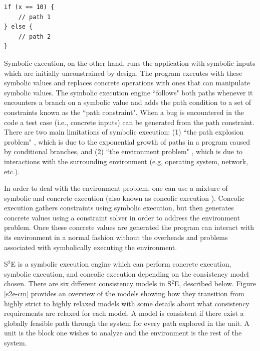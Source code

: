 \documentclass[conference]{IEEEtran}
\begin{document}
\begin{lstlisting}[style=C, label=code-fuzzing, abovecaptionskip=2ex, captionpos=b, caption={Code example where fuzzing generally has poor coverage}]
if (x == 10) {
	// path 1
} else {
	// path 2
}
\end{lstlisting}

 Symbolic execution, on the other hand, runs the application with symbolic inputs \cite{klee} which are initially unconstrained by design. The program executes with these symbolic values and replaces concrete operations with ones that can manipulate symbolic values. The symbolic execution engine ``follows" both paths whenever it encounters a branch on a symbolic value and adds the path condition to a set of constraints known as the ``path constraint". When a bug is encountered in the code a test case (i.e., concrete inputs) can be generated from the path constraint. There are two main limitations of symbolic execution: (1) ``the path explosion problem" \cite{s2e}, which is due to the exponential growth of paths in a program caused by conditional branches, and (2) ``the environment problem" \cite{klee}, which is due to interactions with the surrounding environment (e.g, operating system, network, etc.).

 In order to deal with the environment problem, one can use a mixture of symbolic and concrete execution (also known as concolic execution \cite{cute}). Concolic execution gathers constraints using symbolic execution, but then generates concrete values using a constraint solver in order to address the environment problem. Once these concrete values are generated the program can interact with its environment in a normal fashion without the overheads and problems associated with symbolically executing the environment.

S$^2$E is a symbolic execution engine which can perform concrete execution, symbolic execution, and concolic execution depending on the consistency model chosen. There are six different consistency models in S$^2$E, described below. Figure \ref{s2e-cm} provides an overview of the models showing how they transition from highly strict to highly relaxed models with some details about what consistency requirements are relaxed for each model. A model is consistent if there exist a globally feasible path through the system for every path explored in the unit. A unit is the block one wishes to analyze and the environment is the rest of the system.
\end{document}
